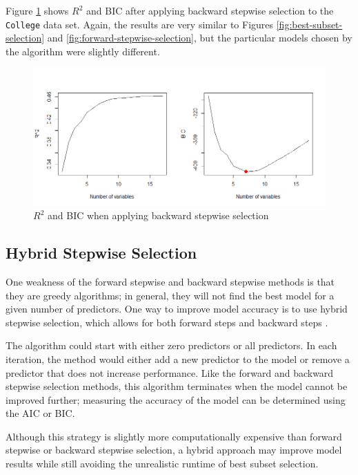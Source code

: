 \documentclass{article}
\begin{document}
Figure \ref{fig:backward-stepwise-selection} shows $R^2$ and BIC after applying backward stepwise selection to the \lstinline!College! data set. Again, the results are very similar to Figures \ref{fig:best-subset-selection} and \ref{fig:forward-stepwise-selection}, but the particular models chosen by the algorithm were slightly different. 

\begin{figure}[!h]
	\label{fig:backward-stepwise-selection}
	\centering
	\caption{$R^2$ and BIC when applying backward stepwise selection}
	\includegraphics[width = 6in]{backward-stepwise-selection.png}
\end{figure}

\subsection{Hybrid Stepwise Selection}
One weakness of the forward stepwise and backward stepwise methods is that they are greedy algorithms; in general, they will not find the best model for a given number of predictors. One way to improve model accuracy is to use hybrid stepwise selection, which allows for both forward steps and backward steps \cite{friedman2001elements}.

The algorithm could start with either zero predictors or all predictors. In each iteration, the method would either add a new predictor to the model or remove a predictor that does not increase performance. Like the forward and backward stepwise selection methods, this algorithm terminates when the model cannot be improved further; measuring the accuracy of the model can be determined using the AIC or BIC.

Although this strategy is slightly more computationally expensive than forward stepwise or backward stepwise selection, a hybrid approach may improve model results while still avoiding the unrealistic runtime of best subset selection.
\end{document}
